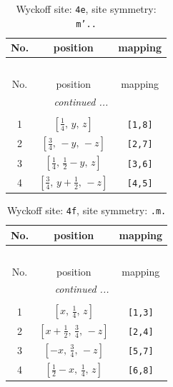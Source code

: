 \documentclass[fleqn,8pt]{jsarticle}
\begin{document}
\renewcommand{\arraystretch}{1.2}
\begin{longtable}{ccc}
\caption{Wyckoff site: {\tt 4e}, site symmetry: {\tt m'..}}
 \\
 \hline \hline
No. & position & mapping \\ \hline \endfirsthead

\multicolumn{2}{l}{\tablename\ \thetable{}} \\
 \hline \hline
No. & position & mapping \\ \hline \endhead

 \hline \hline
\multicolumn{2}{r}{\footnotesize\it continued ...} \\ \endfoot

 \hline \hline
\multicolumn{2}{r}{} \\ \endlastfoot

1 & $\left[ \frac{1}{4},\, y,\, z \right]$ & {\tt [1,8]} \\ \hline
2 & $\left[ \frac{3}{4},\, - y,\, - z \right]$ & {\tt [2,7]} \\ \hline
3 & $\left[ \frac{1}{4},\, \frac{1}{2} - y,\, z \right]$ & {\tt [3,6]} \\ \hline
4 & $\left[ \frac{3}{4},\, y + \frac{1}{2},\, - z \right]$ & {\tt [4,5]} \\
\end{longtable}
\renewcommand{\arraystretch}{1.2}
\begin{longtable}{ccc}
\caption{Wyckoff site: {\tt 4f}, site symmetry: {\tt .m.}}
 \\
 \hline \hline
No. & position & mapping \\ \hline \endfirsthead

\multicolumn{2}{l}{\tablename\ \thetable{}} \\
 \hline \hline
No. & position & mapping \\ \hline \endhead

 \hline \hline
\multicolumn{2}{r}{\footnotesize\it continued ...} \\ \endfoot

 \hline \hline
\multicolumn{2}{r}{} \\ \endlastfoot

1 & $\left[ x,\, \frac{1}{4},\, z \right]$ & {\tt [1,3]} \\ \hline
2 & $\left[ x + \frac{1}{2},\, \frac{3}{4},\, - z \right]$ & {\tt [2,4]} \\ \hline
3 & $\left[ - x,\, \frac{3}{4},\, - z \right]$ & {\tt [5,7]} \\ \hline
4 & $\left[ \frac{1}{2} - x,\, \frac{1}{4},\, z \right]$ & {\tt [6,8]} \\
\end{longtable}
\end{document}
